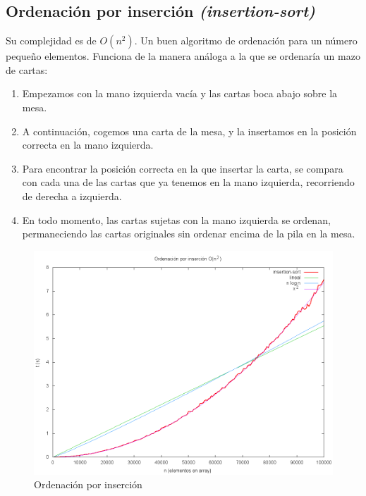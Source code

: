 \subsection{Ordenación por inserción \textit{(insertion-sort)}}
Su complejidad es de $O(n^2)$. Un buen algoritmo de ordenación para un número pequeño elementos. Funciona de la manera análoga a la que se ordenaría un mazo de cartas:\cite{CORMEN}
\begin{enumerate}
	\item Empezamos con la mano izquierda vacía y las cartas boca abajo sobre la mesa.
	\item A continuación, cogemos una carta de la mesa, y la insertamos en la posición correcta 			en la mano izquierda.
	\item Para encontrar la posición correcta en la que insertar la carta, se compara con cada 			una de las cartas que ya tenemos en la mano izquierda, recorriendo de derecha a 					izquierda.
\item En todo momento, las cartas sujetas con la mano izquierda se ordenan, permaneciendo las 			cartas originales sin ordenar encima de la pila en la mesa.
\end{enumerate}

	\begin{figure}[H]
  		\centering
   		 \includegraphics[width=1.0\textwidth]{insertion-sort.png}
  		\caption{Ordenación por inserción}
 			 \label{fig:insertion}
		\end{figure}

\newpage
